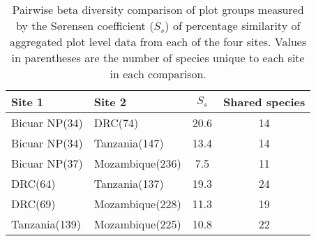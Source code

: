 \begin{table}
	\caption[Pairwise S\o{}rensen coefficient of similarity among sites]{Pairwise beta diversity comparison of plot groups measured by the S\o{}rensen coefficient ($S_s$) of percentage similarity of aggregated plot level data from each of the four sites. Values in parentheses are the number of species unique to each site in each comparison.} 
	\label{bicuar:site_pairs_js} 
	\begin{tabular}{llS[table-format=2.1]S[table-format=2.0]} 
\toprule
{Site 1} & {Site 2} & {$S_s$} & {Shared species} \\
\midrule
Bicuar NP(34) & DRC(74) & 20.6 & 14 \\ 
Bicuar NP(34) & Tanzania(147) & 13.4 & 14 \\ 
Bicuar NP(37) & Mozambique(236) & 7.5 & 11 \\ 
DRC(64) & Tanzania(137) & 19.3 & 24 \\ 
DRC(69) & Mozambique(228) & 11.3 & 19 \\ 
Tanzania(139) & Mozambique(225) & 10.8 & 22 \\ 
\bottomrule
\end{tabular} 
\end{table} 
